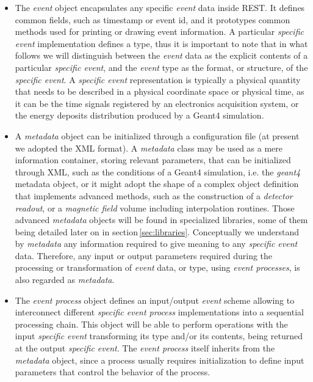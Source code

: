 \begin{itemize}
    \item The \emph{event} object encapsulates any specific \emph{event} data inside REST. It defines common fields, such as timestamp or event id, and it prototypes common methods used for printing or drawing event information. A particular \emph{specific event} implementation defines a type, thus it is important to note that in what follows we will distinguish between the \emph{event} data as the explicit contents of a particular \emph{specific event}, and the \emph{event} type as the format, or structure, of the \emph{specific event}. A \emph{specific event} representation is typically a physical quantity that needs to be described in a physical coordinate space or physical time, as it can be the time signals registered by an electronics acquisition system, or the energy deposits distribution produced by a Geant4 simulation.
    
    \item A \emph{metadata} object can be initialized through a configuration file (at present we adopted the XML format). A \emph{metadata} class may be used as a mere information container, storing relevant parameters, that can be initialized through XML, such as the conditions of a Geant4 simulation, i.e. the \emph{geant4} metadata object, or it might adopt the shape of a complex object definition that implements advanced methods, such as the construction of a \emph{detector readout}, or a \emph{magnetic field} volume including interpolation routines. Those advanced \emph{metadata} objects will be found in specialized libraries, some of them being detailed later on in section\,\ref{sec:libraries}. Conceptually we understand by \emph{metadata} any information required to give meaning to any \emph{specific event} data. Therefore, any input or output parameters required during the processing or transformation of \emph{event} data, or type, using \emph{event processes}, is also regarded as \emph{metadata}. 
    
    \item The \emph{event process} object defines an input/output \emph{event} scheme allowing to interconnect different \emph{specific event process} implementations into a sequential processing chain. This object will be able to perform operations with the input \emph{specific event} transforming its type and/or its contents, being returned at the output \emph{specific event}. The \emph{event process} itself inherits from the \emph{metadata} object, since a process usually requires initialization to define input parameters that control the behavior of the process.
\end{itemize}

